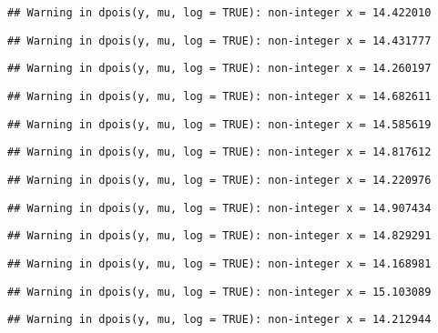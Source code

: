\documentclass[
]{article}
\begin{document}
\begin{verbatim}
## Warning in dpois(y, mu, log = TRUE): non-integer x = 14.422010
\end{verbatim}

\begin{verbatim}
## Warning in dpois(y, mu, log = TRUE): non-integer x = 14.431777
\end{verbatim}

\begin{verbatim}
## Warning in dpois(y, mu, log = TRUE): non-integer x = 14.260197
\end{verbatim}

\begin{verbatim}
## Warning in dpois(y, mu, log = TRUE): non-integer x = 14.682611
\end{verbatim}

\begin{verbatim}
## Warning in dpois(y, mu, log = TRUE): non-integer x = 14.585619
\end{verbatim}

\begin{verbatim}
## Warning in dpois(y, mu, log = TRUE): non-integer x = 14.817612
\end{verbatim}

\begin{verbatim}
## Warning in dpois(y, mu, log = TRUE): non-integer x = 14.220976
\end{verbatim}

\begin{verbatim}
## Warning in dpois(y, mu, log = TRUE): non-integer x = 14.907434
\end{verbatim}

\begin{verbatim}
## Warning in dpois(y, mu, log = TRUE): non-integer x = 14.829291
\end{verbatim}

\begin{verbatim}
## Warning in dpois(y, mu, log = TRUE): non-integer x = 14.168981
\end{verbatim}

\begin{verbatim}
## Warning in dpois(y, mu, log = TRUE): non-integer x = 15.103089
\end{verbatim}

\begin{verbatim}
## Warning in dpois(y, mu, log = TRUE): non-integer x = 14.212944
\end{verbatim}
\end{document}

